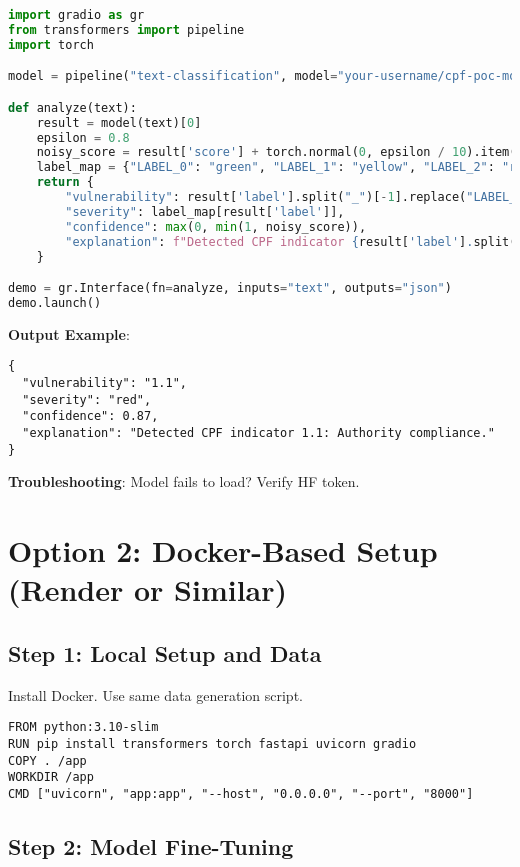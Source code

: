 \documentclass[11pt,a4paper]{article}
\begin{document}
\begin{lstlisting}[language=Python, caption=Gradio Interface]
import gradio as gr
from transformers import pipeline
import torch

model = pipeline("text-classification", model="your-username/cpf-poc-model")

def analyze(text):
    result = model(text)[0]
    epsilon = 0.8
    noisy_score = result['score'] + torch.normal(0, epsilon / 10).item()
    label_map = {"LABEL_0": "green", "LABEL_1": "yellow", "LABEL_2": "red"}
    return {
        "vulnerability": result['label'].split("_")[-1].replace("LABEL_", ""),
        "severity": label_map[result['label']],
        "confidence": max(0, min(1, noisy_score)),
        "explanation": f"Detected CPF indicator {result['label'].split('_')[-1]}."
    }

demo = gr.Interface(fn=analyze, inputs="text", outputs="json")
demo.launch()
\end{lstlisting}

\textbf{Output Example}:
\begin{verbatim}
{
  "vulnerability": "1.1",
  "severity": "red",
  "confidence": 0.87,
  "explanation": "Detected CPF indicator 1.1: Authority compliance."
}
\end{verbatim}

\textbf{Troubleshooting}: Model fails to load? Verify HF token.

\section{Option 2: Docker-Based Setup (Render or Similar)}

\subsection{Step 1: Local Setup and Data}

Install Docker. Use same data generation script.

\begin{lstlisting}[language=Docker, caption=Dockerfile]
FROM python:3.10-slim
RUN pip install transformers torch fastapi uvicorn gradio
COPY . /app
WORKDIR /app
CMD ["uvicorn", "app:app", "--host", "0.0.0.0", "--port", "8000"]
\end{lstlisting}

\subsection{Step 2: Model Fine-Tuning}
\end{document}
